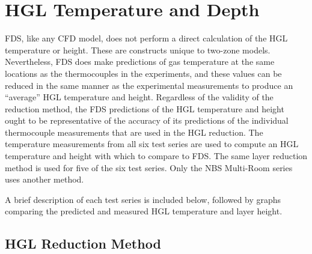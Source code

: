 \chapter{HGL Temperature and Depth}

\label{HGL:Chapter}

FDS, like any CFD model, does not perform a direct calculation of the HGL temperature or height. These are constructs unique to two-zone models.
Nevertheless, FDS does make predictions of gas temperature at the same locations as the thermocouples in the experiments, and these
values can be reduced in the same manner as the experimental measurements to produce an ``average'' HGL temperature and height.  Regardless of the
validity of the reduction method, the FDS predictions of the HGL temperature and height ought to be representative of the accuracy of its predictions
of the individual thermocouple measurements that are used in the HGL reduction. The temperature measurements from all six test series are used to
compute an HGL temperature and height with which to compare to FDS.  The same layer reduction method is used for five of the six test series. Only
the NBS Multi-Room series uses another method.

A brief description of each test series is included below, followed by graphs comparing the predicted and measured HGL temperature and layer height.


\section{HGL Reduction Method}

